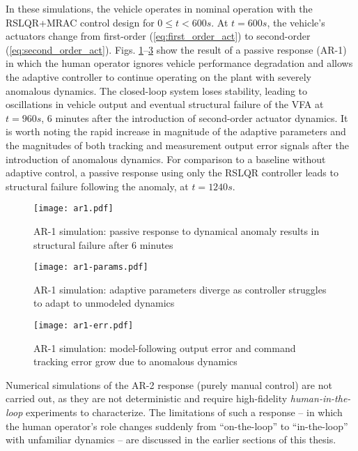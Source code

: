 In these simulations, the vehicle operates in nominal operation with the RSLQR+MRAC control design for $0 \leq t < 600 s$. At $t = 600 s$, the vehicle's actuators change from first-order (\ref{eq:first_order_act}) to second-order (\ref{eq:second_order_act}). Figs. \ref{fig:ar1}--\ref{fig:ar1-err} show the result of a passive response (AR-1) in which the human operator ignores vehicle performance degradation and allows the adaptive controller to continue operating on the plant with severely anomalous dynamics. The closed-loop system loses stability, leading to oscillations in vehicle output and eventual structural failure of the VFA at $t = 960s$, 6 minutes after the introduction of second-order actuator dynamics. It is worth noting the rapid increase in magnitude of the adaptive parameters and the magnitudes of both tracking and measurement output error signals after the introduction of anomalous dynamics. For comparison to a baseline without adaptive control, a passive response using only the RSLQR controller leads to structural failure following the anomaly, at $t = 1240s$.

\begin{figure}[htbp]
	\centering
	\texttt{[image: ar1.pdf]}
	\caption{AR-1 simulation: passive response to dynamical anomaly results in structural failure after 6 minutes}
	\label{fig:ar1}
\end{figure}

\begin{figure}[htbp]
	\centering
	\texttt{[image: ar1-params.pdf]}
	\caption{AR-1 simulation: adaptive parameters diverge as controller struggles to adapt to unmodeled dynamics}
	\label{fig:ar1-params}
\end{figure}

\begin{figure}[htbp]
	\centering
	\texttt{[image: ar1-err.pdf]}
	\caption{AR-1 simulation: model-following output error and command tracking error grow due to anomalous dynamics}
	\label{fig:ar1-err}
\end{figure}

Numerical simulations of the AR-2 response (purely manual control) are not carried out, as they are not deterministic and require high-fidelity \textit{human-in-the-loop} experiments to characterize. The limitations of such a response -- in which the human operator's role changes suddenly from ``on-the-loop'' to ``in-the-loop'' with unfamiliar dynamics -- are discussed in the earlier sections of this thesis.

